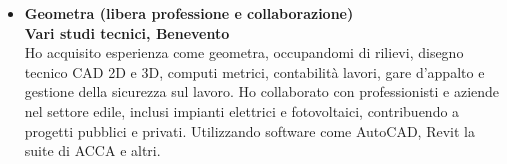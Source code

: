\documentclass[a4paper,10pt]{article}
\begin{document}
\begin{itemize}[leftmargin=*]
  \item \textbf{\textcolor{mainblue}{Geometra (libera professione e collaborazione)}}\\
  \textbf {Vari studi tecnici, Benevento \quad {[ 05/09/2011 – 30/03/2019]}}\\
  Ho acquisito esperienza come geometra, occupandomi di rilievi, disegno tecnico CAD 2D e 3D, computi metrici, contabilità lavori, gare d’appalto e gestione della sicurezza sul lavoro. Ho collaborato con professionisti e aziende nel settore edile, inclusi impianti elettrici e fotovoltaici, contribuendo a progetti pubblici e privati. Utilizzando software come AutoCAD, Revit la suite di ACCA e altri.
\end{itemize}

\hrulefill

\end{document}
